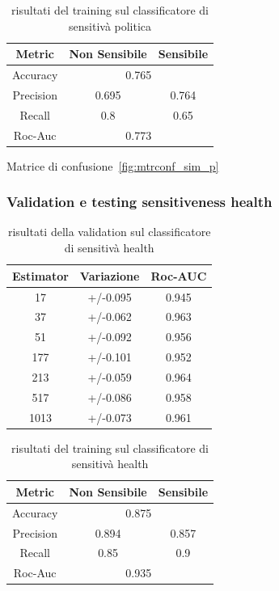 \begin{table}[h]
\label{tbl:training_sens_pol}
\centering
\begin{tabular}{|c|c|c|}
\hline
\textbf{Metric} & \textbf{Non Sensibile} & \textbf{Sensibile} \\ \hline
Accuracy & \multicolumn{2}{c|}{0.765} \\ \hline
Precision & 0.695 & 0.764 \\ \hline
Recall & 0.8 & 0.65 \\ \hline
Roc-Auc & \multicolumn{2}{c|}{0.773} \\ \hline
\end{tabular}
\caption{risultati del training sul classificatore di sensitivà politica}
\end{table}
\FloatBarrier

Matrice di confusione~\ref{fig:mtrconf_sim_p}

\subsubsection{Validation e testing sensitiveness health}
\label{sssec:val_testing_health}

\begin{table}[h]
\label{tbl:val_sens_health}
\centering
\begin{tabular}{|c|c|c|}
\hline
\textbf{Estimator} & \textbf{Variazione} & \textbf{Roc-AUC} \\ \hline
17 & +/-0.095 & 0.945 \\ \hline
37 & +/-0.062 & 0.963 \\ \hline
51 & +/-0.092 & 0.956 \\ \hline
177 & +/-0.101 & 0.952 \\ \hline
213 & +/-0.059 & 0.964 \\ \hline
517 & +/-0.086 & 0.958 \\ \hline
1013 & +/-0.073 & 0.961 \\ \hline
\end{tabular}
\caption{risultati della validation sul classificatore di sensitivà health}
\end{table}
\FloatBarrier

\begin{table}[h]
\label{tbl:training_sens_health}
\centering
\begin{tabular}{|c|c|c|}
\hline
\textbf{Metric} & \textbf{Non Sensibile} & \textbf{Sensibile} \\ \hline
Accuracy & \multicolumn{2}{c|}{0.875} \\ \hline
Precision & 0.894 & 0.857 \\ \hline
Recall & 0.85 & 0.9 \\ \hline
Roc-Auc & \multicolumn{2}{c|}{0.935} \\ \hline
\end{tabular}
\caption{risultati del training sul classificatore di sensitivà health}
\end{table}
\FloatBarrier

